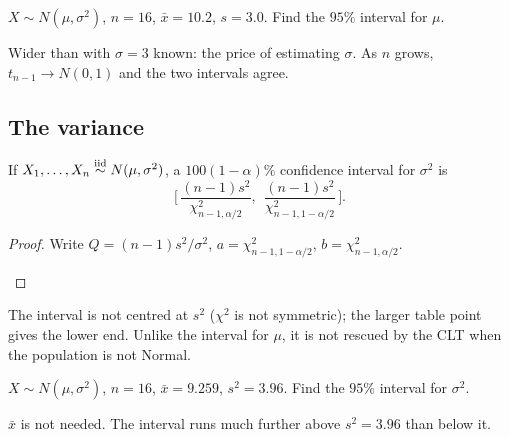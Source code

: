 \begin{example}
$X\sim N(\mu,\sigma^2)$, $n=16$, $\bar x=10.2$, $s=3.0$. Find the $95\%$ interval for $\mu$.
\begin{deriv}
\end{deriv}
Wider than with $\sigma=3$ known: the price of estimating $\sigma$. As $n$ grows, $t_{n-1}\to N(0,1)$ and the two intervals agree.
\end{example}

\subsection*{The variance}

\begin{theorem}
If $X_1,\dots,X_n\overset{\text{iid}}{\sim} N(\mu,\sigma^2)$, a $100(1-\alpha)\%$ confidence interval for $\sigma^2$ is
\[
  \boxed{\;\bigg[\,\frac{(n-1)s^2}{\chi^2_{n-1,\alpha/2}},\ \ \frac{(n-1)s^2}{\chi^2_{n-1,1-\alpha/2}}\,\bigg].\;}
\]
\end{theorem}
\begin{proof}
Write $Q=(n-1)s^2/\sigma^2$, $a=\chi^2_{n-1,1-\alpha/2}$, $b=\chi^2_{n-1,\alpha/2}$.
\begin{deriv}
\end{deriv}
\end{proof}

The interval is not centred at $s^2$ ($\chi^2$ is not symmetric); the larger table point gives the lower end. Unlike the interval for $\mu$, it is not rescued by the CLT when the population is not Normal.

\begin{example}
$X\sim N(\mu,\sigma^2)$, $n=16$, $\bar x=9.259$, $s^2=3.96$. Find the $95\%$ interval for $\sigma^2$.
\begin{deriv}
\end{deriv}
$\bar x$ is not needed. The interval runs much further above $s^2=3.96$ than below it.
\end{example}

